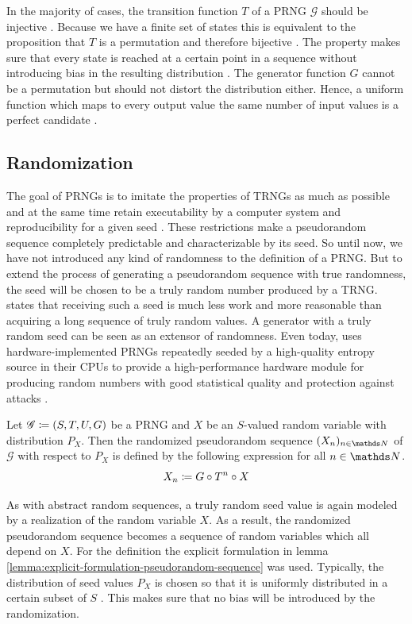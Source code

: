 \documentclass{stdlocal}
\begin{document}
  In the majority of cases, the transition function $T$ of a PRNG $\mathscr{G}$ should be injective \autocite{lecuyer1994,lecuyer2015,widynski2019,oneill2014}.
  Because we have a finite set of states this is equivalent to the proposition that $T$ is a permutation and therefore bijective \autocite[\ppno~201-202]{waldmann2017}.
  The property makes sure that every state is reached at a certain point in a sequence without introducing bias in the resulting distribution \autocite{oneill2014}.
  The generator function $G$ cannot be a permutation but should not distort the distribution either.
  Hence, a uniform function which maps to every output value the same number of input values is a perfect candidate \autocite{oneill2014}.

  \subsection{Randomization}
  The goal of PRNGs is to imitate the properties of TRNGs as much as possible \autocite{lecuyer1994} and at the same time retain executability by a computer system and reproducibility for a given seed \autocite{lecuyer2015}.
  These restrictions make a pseudorandom sequence completely predictable and characterizable by its seed.
  So until now, we have not introduced any kind of randomness to the definition of a PRNG.
  But to extend the process of generating a pseudorandom sequence with true randomness, the seed will be chosen to be a truly random number produced by a TRNG.
  \textcite{lecuyer1994} states that receiving such a seed is much less work and more reasonable than acquiring a long sequence of truly random values.
  A generator with a truly random seed can be seen as an extensor of randomness.
  Even today, \citeauthor{intel-drng} uses hardware-implemented PRNGs repeatedly seeded by a high-quality entropy source in their CPUs to provide a high-performance hardware module for producing random numbers with good statistical quality and protection against attacks \autocite{intel-drng}.

  \begin{definition}
    Let $\mathscr{G}\coloneqq (S,T,U,G)$ be a PRNG and $X$ be an $S$-valued random variable with distribution $P_X$.
    Then the randomized pseudorandom sequence $(X_n)_{n\in\setNatural}$ of $\mathscr{G}$ with respect to $P_X$ is defined by the following expression for all $n\in\setNatural$.
    \[
      X_n \coloneqq G \circ T^n \circ X
    \]
  \end{definition}
  As with abstract random sequences, a truly random seed value is again modeled by a realization of the random variable $X$.
  As a result, the randomized pseudorandom sequence becomes a sequence of random variables which all depend on $X$.
  For the definition the explicit formulation in lemma \ref{lemma:explicit-formulation-pseudorandom-sequence} was used.
  Typically, the distribution of seed values $P_X$ is chosen so that it is uniformly distributed in a certain subset of $S$ \autocite{matsumoto1998,oneill2014,lecuyer1994,lecuyer2015,bauke2007}.
  This makes sure that no bias will be introduced by the randomization.
\end{document}
